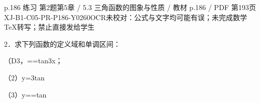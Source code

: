 \begin{bankitem}{p.186 练习 第2题}{第5章 / 5.3 三角函数的图象与性质 / 教材 p.186 / PDF 第193页}{XJ-B1-C05-PR-P186-Y0260}{OCR未校对：公式与文字均可能有误；未完成数学TeX转写；禁止直接发给学生}
\begin{ocrdraft}
\par
2．求下列函数的定义域和单调区间：
\par
（D3，==tan3x；
\par
（2）y=3tan
\par
（3）y==tan
\end{ocrdraft}
\end{bankitem}
